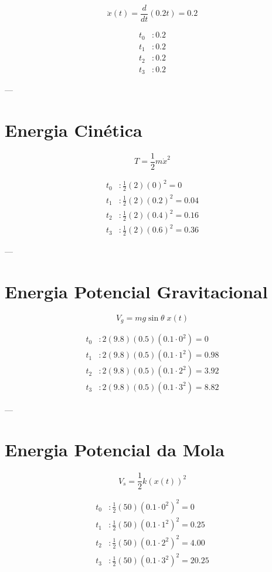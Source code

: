 \documentclass[a4paper,12pt]{article}
\begin{document}
\[
\ddot{x}(t) = \frac{d}{dt}(0.2t) = 0.2
\]

\begin{align*}
t_0 &: 0.2 \\ 
t_1 &: 0.2 \\ 
t_2 &: 0.2 \\ 
t_3 &: 0.2
\end{align*}

---

\section*{Energia Cinética}

\[
T = \frac{1}{2} m \dot{x}^2
\]

\begin{align*}
t_0 &: \tfrac{1}{2}(2)(0)^2 = 0 \\
t_1 &: \tfrac{1}{2}(2)(0.2)^2 = 0.04 \\
t_2 &: \tfrac{1}{2}(2)(0.4)^2 = 0.16 \\
t_3 &: \tfrac{1}{2}(2)(0.6)^2 = 0.36
\end{align*}

---

\section*{Energia Potencial Gravitacional}

\[
V_g = m g \sin\theta \; x(t)
\]

\begin{align*}
t_0 &: 2(9.8)(0.5)(0.1 \cdot 0^2) = 0 \\
t_1 &: 2(9.8)(0.5)(0.1 \cdot 1^2) = 0.98 \\
t_2 &: 2(9.8)(0.5)(0.1 \cdot 2^2) = 3.92 \\
t_3 &: 2(9.8)(0.5)(0.1 \cdot 3^2) = 8.82
\end{align*}

---

\section*{Energia Potencial da Mola}

\[
V_s = \frac{1}{2} k (x(t))^2
\]

\begin{align*}
t_0 &: \tfrac{1}{2}(50)(0.1 \cdot 0^2)^2 = 0 \\
t_1 &: \tfrac{1}{2}(50)(0.1 \cdot 1^2)^2 = 0.25 \\
t_2 &: \tfrac{1}{2}(50)(0.1 \cdot 2^2)^2 = 4.00 \\
t_3 &: \tfrac{1}{2}(50)(0.1 \cdot 3^2)^2 = 20.25
\end{align*}
\end{document}
